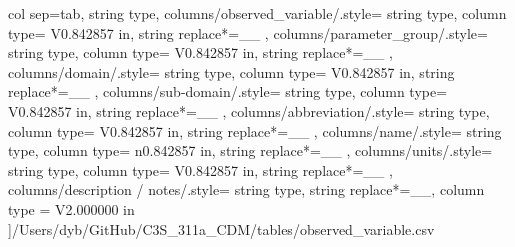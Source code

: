 \begin{landscape}
    col sep=tab,
    string type,
    columns/observed_variable/.style={
            string type, 
            column type= V{0.842857 in}, 
            string replace*={_}{\_}
        },
    columns/parameter_group/.style={
            string type, 
            column type= V{0.842857 in}, 
            string replace*={_}{\_}
        },
    columns/domain/.style={
            string type, 
            column type= V{0.842857 in}, 
            string replace*={_}{\_}
        },
    columns/sub-domain/.style={
            string type, 
            column type= V{0.842857 in}, 
            string replace*={_}{\_}
        },
    columns/abbreviation/.style={
            string type, 
            column type= V{0.842857 in}, 
            string replace*={_}{\_}
        },
    columns/name/.style={
            string type, 
            column type= n{0.842857 in}, 
            string replace*={_}{\_}
        },
    columns/units/.style={
            string type, 
            column type= V{0.842857 in}, 
            string replace*={_}{\_}
        },
    columns/description / notes/.style={
            string type, 
            string replace*={_}{\_},
            column type = V{2.000000 in}
        }
    ]{/Users/dyb/GitHub/C3S_311a_CDM/tables/observed_variable.csv}
\end{landscape}
